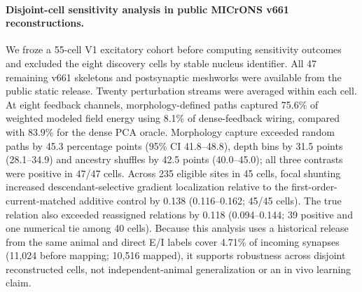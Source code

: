 \paragraph{Disjoint-cell sensitivity analysis in public MICrONS v661 reconstructions.}
We froze a 55-cell V1 excitatory cohort before computing sensitivity outcomes and excluded the eight discovery cells by stable nucleus identifier. All 47 remaining v661 skeletons and postsynaptic meshworks were available from the public static release. Twenty perturbation streams were averaged within each cell. At eight feedback channels, morphology-defined paths captured 75.6\% of weighted modeled field energy using 8.1\% of dense-feedback wiring, compared with 83.9\% for the dense PCA oracle. Morphology capture exceeded random paths by 45.3 percentage points (95\% CI 41.8--48.8), depth bins by 31.5 points (28.1--34.9) and ancestry shuffles by 42.5 points (40.0--45.0); all three contrasts were positive in 47/47 cells. Across 235 eligible sites in 45 cells, focal shunting increased descendant-selective gradient localization relative to the first-order-current-matched additive control by 0.138 (0.116--0.162; 45/45 cells). The true relation also exceeded reassigned relations by 0.118 (0.094--0.144; 39 positive and one numerical tie among 40 cells). Because this analysis uses a historical release from the same animal and direct E/I labels cover 4.71\% of incoming synapses (11,024 before mapping; 10,516 mapped), it supports robustness across disjoint reconstructed cells, not independent-animal generalization or an in vivo learning claim.
